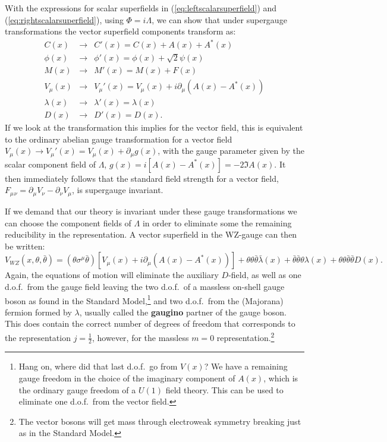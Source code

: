 \documentclass[notes.tex]{subfiles}
\begin{document}
With the expressions for scalar superfields in (\ref{eq:leftscalarsuperfield}) and (\ref{eq:rightscalarsuperfield}), using $\Phi=i\Lambda$, we can show that under supergauge transformations the vector superfield components transform as:
\begin{eqnarray}
C(x) &\to& C'(x) = C(x) + A(x) + A^*(x)\\
\phi(x) &\to& \phi'(x) = \phi(x) + \sqrt{2}\psi(x)\\
M(x) &\to& M'(x) = M(x) + F(x)\\
V_\mu(x) &\to& V_\mu'(x) = V_\mu(x) +i\partial_\mu(A(x) - A^*(x))\\
\lambda(x) &\to& \lambda'(x) = \lambda(x)\\
D(x) &\to& D'(x) = D(x). \label{eq:supergaugetrans_Dterm}
\end{eqnarray}
If we look at the transformation this implies for the vector field, this is equivalent to the ordinary abelian gauge transformation for a vector field  $V_\mu(x)\to V_\mu'(x) = V_\mu(x) +\partial_\mu g(x)$, with the gauge parameter given by the scalar component field of $\Lambda$, $g(x)=i[A(x) - A^*(x)]=-2\Im{A(x)}$. It then immediately follows that the standard field strength for a vector field, $F_\mu{}_\nu = \partial_\mu V_\nu - \partial_\nu V_\mu$, is supergauge invariant. 

If we demand that our theory is invariant under these gauge transformations we can choose the component fields of $\Lambda$ in order to eliminate some the remaining reducibility  in the representation. 
A vector superfield in the WZ-gauge can then be written:
\begin{equation}
V_{WZ} (x, \theta, \bar{\theta}) = (\theta\sigma^\mu \bar{\theta})[V_\mu(x) + i\partial_\mu(A(x) - A^*(x))] + \theta\theta\bar{\theta}\bar{\lambda}(x) + \bar{\theta}\bar{\theta}\theta\lambda (x) + \theta\theta\bar{\theta}\bar{\theta}D(x).
\label{eq:vectorsuperfieldWZ}
\end{equation}
Again, the equations of motion will eliminate the auxiliary $D$-field, as well as one d.o.f.\ from the gauge field leaving the  two d.o.f.\ of a massless on-shell gauge boson as found in the Standard Model,\footnote{Hang on, where did that last d.o.f.\ go from $V(x)$? We have a remaining gauge freedom in the choice of the imaginary component of $A(x)$, which is the ordinary gauge freedom of a $U(1)$ field theory. This can be used to eliminate one d.o.f.\ from the vector field.}  and two d.o.f.\ from the (Majorana) fermion formed by $\lambda$, usually called the {\bf gaugino} partner of the gauge boson. This does contain the correct number of degrees of freedom that corresponds to the representation $j=\frac{1}{2}$, however, for the massless $m=0$ representation.\footnote{The vector bosons will get mass through electroweak symmetry breaking just as in the Standard Model.}
\end{document}
